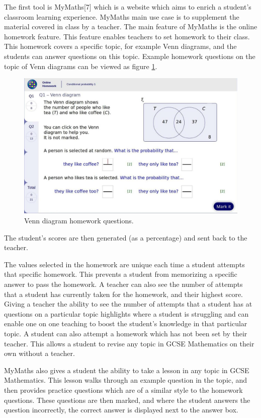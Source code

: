 \documentclass{article}
\begin{document}
The first tool is MyMaths[7] which is a website which aims to enrich a student's classroom learning experience. MyMaths main use case is to supplement the material covered in class by a teacher. The main feature of MyMaths is the online homework feature. This feature enables teachers to set homework to their class. This homework covers a specific topic, for example Venn diagrams, and the students can answer questions on this topic. Example homework questions on the topic of Venn diagrams can be viewed as figure \ref{figure:mymathsHomeworkQuestion1}.
\begin{figure}[H]
	\centering
	\includegraphics[width=0.9\linewidth]{./data/mymathsQuestion1.jpg}
	\caption{Venn diagram homework questions.}
	\label{figure:mymathsHomeworkQuestion1}
\end{figure}
The student's scores are then generated (as a percentage) and sent back to the teacher. \par

The values selected in the homework are unique each time a student attempts that specific homework. This prevents a student from memorizing a specific answer to pass the homework. A teacher can also see the number of attempts that a student has currently taken for the homework, and their highest score. Giving a teacher the ability to see the number of attempts that a student has at questions on a particular topic highlights where a student is struggling and can enable one on one teaching to boost the student's knowledge in that particular topic. A student can also attempt a homework which has not been set by their teacher. This allows a student to revise any topic in GCSE Mathematics on their own without a teacher. \par

MyMaths also gives a student the ability to take a lesson in any topic in GCSE Mathematics. This lesson walks through an example question in the topic, and then provides practice questions which are of a similar style to the homework questions. These questions are then marked, and where the student answers the question incorrectly, the correct answer is displayed next to the answer box. \par
\end{document}
